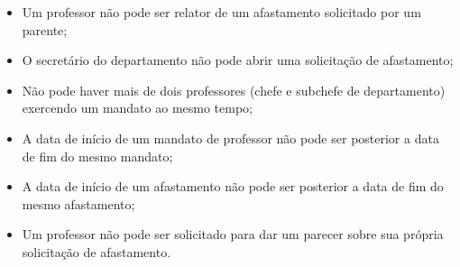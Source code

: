 \begin{itemize}

	\item Um professor não pode ser relator de um afastamento solicitado por um parente;
	
	\item O secretário do departamento não pode abrir uma solicitação de afastamento;
	
	\item Não pode haver mais de dois professores (chefe e subchefe de departamento) exercendo um mandato ao mesmo tempo;
	
	\item A data de início de um mandato de professor não pode ser posterior a data de fim do mesmo mandato;
	
	\item A data de início de um afastamento não pode ser posterior a data de fim do mesmo afastamento;
	
	\item Um professor não pode ser solicitado para dar um parecer sobre sua própria solicitação de afastamento. 
   
\end{itemize} 

